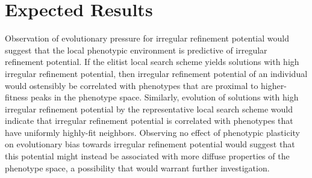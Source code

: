 \section{Expected Results}
Observation of evolutionary pressure for irregular refinement potential would suggest that the local phenotypic environment is predictive of irregular refinement potential.
If the elitist local search scheme yields solutions with high irregular refinement potential, then irregular refinement potential of an individual would ostensibly be correlated with phenotypes that are proximal to higher-fitness peaks in the phenotype space.
Similarly, evolution of solutions with high irregular refinement potential by the representative local search scheme would indicate that irregular refinement potential is correlated with phenotypes that have uniformly highly-fit neighbors.
Observing no effect of phenotypic plasticity on evolutionary bias towards irregular refinement potential would suggest that this potential might instead be associated with more diffuse properties of the phenotype space, a possibility that would warrant further investigation.
